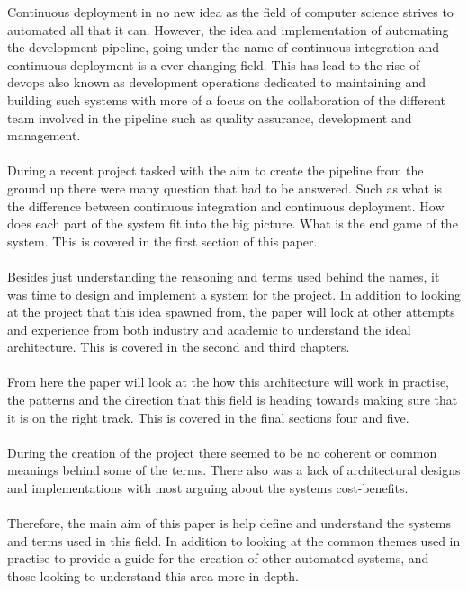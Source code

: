 Continuous deployment in no new idea as the field of computer science strives to automated all that it can. However, the idea and implementation of automating the development pipeline, going under the name of continuous integration and continuous deployment is a ever changing field. This has lead to the rise of devops also known as development operations dedicated to maintaining and building such systems with more of a focus on the collaboration of the different team involved in the pipeline such as quality assurance, development and management.
\\\\
During a recent project tasked with the aim to create the pipeline from the ground up there were many question that had to be answered. Such as what is the difference between continuous integration and continuous deployment. How does each part of the system fit into the big picture. What is the end game of the system. This is covered in the first section of this paper.
\\\\
Besides just understanding the reasoning and terms used behind the names, it was time to design and implement a system for the project. In addition to looking at the project that this idea spawned from, the paper will look at other attempts and experience from both industry and academic to understand the ideal architecture. This is covered in the second and third chapters.
\\\\
From here the paper will look at the how this architecture will work in practise, the patterns and the direction that this field is heading towards making sure that it is on the right track. This is covered in the final sections four and five.
\\\\
During the creation of the project there seemed to be no coherent or common meanings behind some of the terms. There also was a lack of architectural designs and implementations with most arguing about the systems cost-benefits.
\\\\
Therefore, the main aim of this paper is help define and understand the systems and terms used in this field. In addition to looking at the common themes used in practise to provide a guide for the creation of other automated systems, and those looking to understand this area more in depth.
